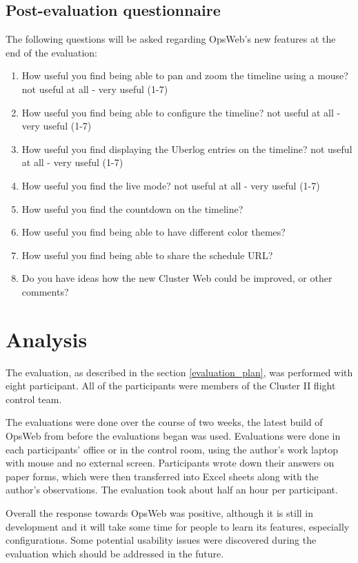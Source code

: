 \subsection{Post-evaluation questionnaire} \label{post-evaluation}
The following questions will be asked regarding OpsWeb's new features at the end of the evaluation:
\begin{enumerate}
\item How useful you find being able to pan and zoom the timeline using a mouse? not useful at all - very useful (1-7)
\item How useful you find being able to configure the timeline? not useful at all - very useful (1-7)
\item How useful you find displaying the Uberlog entries on the timeline? not useful at all - very useful (1-7)
\item How useful you find the live mode? not useful at all - very useful (1-7)
\item How useful you find the countdown on the timeline?
\item How useful you find being able to have different color themes?
\item How useful you find being able to share the schedule URL?
\item Do you have ideas how the new Cluster Web could be improved, or other comments?
\end{enumerate}

\section{Analysis}
The evaluation, as described in the section \ref{evaluation_plan}, was performed with eight participant. All of the participants were members of the Cluster II flight control team.

The evaluations were done over the course of two weeks, the latest build of OpsWeb from before the evaluations began was used. Evaluations were done in each participants' office or in the control room, using the author's work laptop with mouse and no external screen. Participants wrote down their answers on paper forms, which were then transferred into Excel sheets along with the author's observations. The evaluation took about half an hour per participant.

Overall the response towards OpsWeb was positive, although it is still in development and it will take some time for people to learn its features, especially configurations. Some potential usability issues were discovered during the evaluation which should be addressed in the future.


